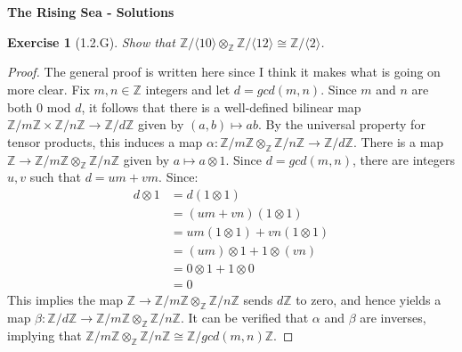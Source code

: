 \documentclass{amsart}
\newtheorem*{exercise*}{Exercise}
\newcommand{\Z}{\mathbb{Z}}
\begin{document}
\pagestyle{empty}
\begin{center} \textbf{The Rising Sea - Solutions} \end{center}


\begin{comment}


\begin{exercise*}[X.Y.Z]
    
\end{exercise*}

\begin{proof}

\end{proof}

\vspace{0.1in}

\end{comment}




\begin{exercise*}[1.2.G]
    Show that $\Z/\langle 10\rangle\otimes_\Z\Z/\langle 12\rangle\cong \Z/\langle 2\rangle$.
\end{exercise*}

\vspace{0.1in}

\begin{proof}
		The general proof is written here since I think it makes what is going on more clear. Fix $m,n\in \Z$ integers and let $d=gcd(m, n)$. Since $m$ and $n$ are both $0$ mod $d$, it follows that there is a well-defined bilinear map $\Z/m\Z\times\Z/n\Z\rightarrow\Z/d\Z$ given by $(a, b)\mapsto ab$. By the universal property for tensor products, this induces a map $\alpha:\Z/m\Z\otimes_\Z\Z/n\Z\rightarrow \Z/d\Z$. There is a map $\Z\rightarrow \Z/m\Z\otimes_\Z\Z/n\Z$ given by $a\mapsto a\otimes1$. Since $d=gcd(m, n)$, there are integers $u, v$ such that $d=um+vm$. Since:
    \begin{align*}
        d\otimes 1 &= d(1\otimes 1) \\
        &= (um+vn)(1\otimes 1) \\
        &= um(1\otimes 1) + vn(1\otimes 1) \\
        &= (um)\otimes 1 + 1\otimes (vn) \\
        &= 0\otimes 1 + 1 \otimes 0 \\
        &= 0
    \end{align*}
    This implies the map $\Z\rightarrow \Z/m\Z\otimes_\Z\Z/n\Z$ sends $d\Z$ to zero, and hence yields a map $\beta:\Z/d\Z\rightarrow \Z/m\Z\otimes_\Z\Z/n\Z$. It can be verified that $\alpha$ and $\beta$ are inverses, implying that $\Z/m\Z\otimes_\Z\Z/n\Z\cong \Z/gcd(m, n)\Z$. 
\end{proof}
\end{document}
